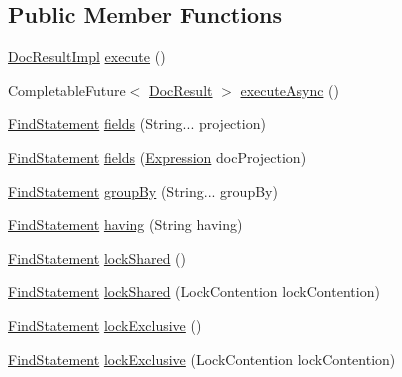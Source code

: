 \subsection*{Public Member Functions}
\begin{DoxyCompactItemize}
\item 
\mbox{\hyperlink{classcom_1_1mysql_1_1cj_1_1xdevapi_1_1_doc_result_impl}{Doc\+Result\+Impl}} \mbox{\hyperlink{classcom_1_1mysql_1_1cj_1_1xdevapi_1_1_find_statement_impl_aa812b042acda3c78caf484a0604faae0}{execute}} ()
\item 
Completable\+Future$<$ \mbox{\hyperlink{interfacecom_1_1mysql_1_1cj_1_1xdevapi_1_1_doc_result}{Doc\+Result}} $>$ \mbox{\hyperlink{classcom_1_1mysql_1_1cj_1_1xdevapi_1_1_find_statement_impl_a851e48c8b47c5c2c34d351fba83ccf85}{execute\+Async}} ()
\item 
\mbox{\hyperlink{interfacecom_1_1mysql_1_1cj_1_1xdevapi_1_1_find_statement}{Find\+Statement}} \mbox{\hyperlink{classcom_1_1mysql_1_1cj_1_1xdevapi_1_1_find_statement_impl_a0949083d6d4ba7dff81c2ead999373bf}{fields}} (String... projection)
\item 
\mbox{\hyperlink{interfacecom_1_1mysql_1_1cj_1_1xdevapi_1_1_find_statement}{Find\+Statement}} \mbox{\hyperlink{classcom_1_1mysql_1_1cj_1_1xdevapi_1_1_find_statement_impl_a52d3c488bb46564fdab7629781d6c99b}{fields}} (\mbox{\hyperlink{classcom_1_1mysql_1_1cj_1_1xdevapi_1_1_expression}{Expression}} doc\+Projection)
\item 
\mbox{\hyperlink{interfacecom_1_1mysql_1_1cj_1_1xdevapi_1_1_find_statement}{Find\+Statement}} \mbox{\hyperlink{classcom_1_1mysql_1_1cj_1_1xdevapi_1_1_find_statement_impl_ad75d9465a8dec5c2340ab8b25678f97d}{group\+By}} (String... group\+By)
\item 
\mbox{\hyperlink{interfacecom_1_1mysql_1_1cj_1_1xdevapi_1_1_find_statement}{Find\+Statement}} \mbox{\hyperlink{classcom_1_1mysql_1_1cj_1_1xdevapi_1_1_find_statement_impl_aa5772a01729fde08c5959498e56b5448}{having}} (String having)
\item 
\mbox{\hyperlink{interfacecom_1_1mysql_1_1cj_1_1xdevapi_1_1_find_statement}{Find\+Statement}} \mbox{\hyperlink{classcom_1_1mysql_1_1cj_1_1xdevapi_1_1_find_statement_impl_acdc867ddce32e3776d059f72a601fbdd}{lock\+Shared}} ()
\item 
\mbox{\hyperlink{interfacecom_1_1mysql_1_1cj_1_1xdevapi_1_1_find_statement}{Find\+Statement}} \mbox{\hyperlink{classcom_1_1mysql_1_1cj_1_1xdevapi_1_1_find_statement_impl_aecf5ef40361b9b8646b416543c82d2d4}{lock\+Shared}} (Lock\+Contention lock\+Contention)
\item 
\mbox{\hyperlink{interfacecom_1_1mysql_1_1cj_1_1xdevapi_1_1_find_statement}{Find\+Statement}} \mbox{\hyperlink{classcom_1_1mysql_1_1cj_1_1xdevapi_1_1_find_statement_impl_a3486c67a7e4b354ff3101b9c5734c5f1}{lock\+Exclusive}} ()
\item 
\mbox{\hyperlink{interfacecom_1_1mysql_1_1cj_1_1xdevapi_1_1_find_statement}{Find\+Statement}} \mbox{\hyperlink{classcom_1_1mysql_1_1cj_1_1xdevapi_1_1_find_statement_impl_abb488a09f4ad595edcb2725712182e38}{lock\+Exclusive}} (Lock\+Contention lock\+Contention)
\end{DoxyCompactItemize}

